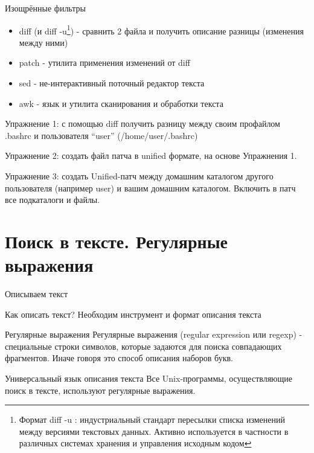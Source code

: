 \begin{frame}{Изощрённые фильтры }
  \begin{itemize}
    \item \alert{diff} (и \alert{diff -u}\footnote{Формат \alert{diff -u} : индустриальный стандарт пересылки списка изменений между версиями текстовых данных. Активно используется в частности в различных системах хранения и управления исходным кодом}) - сравнить 2 файла и получить описание разницы (изменения между ними)
    \item \alert{patch} - утилита применения изменений от diff \pause
    \item \alert{sed} - не-интерактивный поточный редактор текста 
    \item \alert{awk} - язык и утилита сканирования и обработки текста \pause
  \end{itemize}
  
  \alert{Упражнение 1}: с помощью \alert{diff} получить разницу между своим профайлом .bashrc и пользователя ``user'' (/home/user/.bashrc)
  
  \alert{Упражнение 2}: создать файл патча в unified формате, на основе Упражнения 1.

  \alert{Упражнение 3}: создать Unified-патч между домашним каталогом другого пользователя (например user) и вашим домашним каталогом. Включить в патч все подкаталоги и файлы. 
\end{frame}



\section{Поиск в тексте. Регулярные выражения}

\begin{frame}{Описываем текст}

  \begin{block}{Как описать текст?}
    Необходим инструмент и формат описания текста
  \end{block} \pause

  \begin{block}{Регулярные выражения}
    \alert{Регулярные выражения (regular expression или regexp)} -  специальные строки символов, которые задаются для поиска совпадающих фрагментов. Иначе говоря это способ описания наборов букв. 
  \end{block} \pause

  \begin{block}{Универсальный язык описания текста}
    Все Unix-программы, осуществляющие поиск в тексте, используют регулярные выражения.
  \end{block}

\end{frame}

